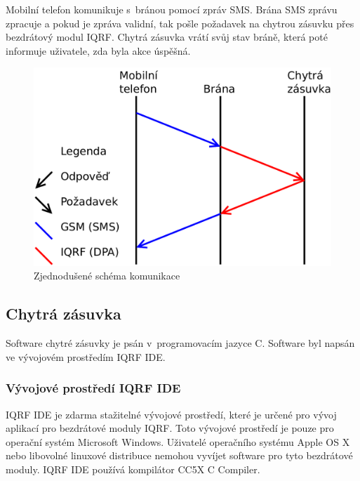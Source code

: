 \documentclass[12pt,a4paper,oneside]{article}
\begin{document}
Mobilní telefon komunikuje s~bránou pomocí zpráv SMS. Brána SMS zprávu zpracuje a pokud je zpráva validní, tak pošle požadavek na chytrou zásuvku přes bezdrátový modul IQRF. Chytrá zásuvka vrátí svůj stav bráně, která poté informuje uživatele, zda byla akce úspěšná.

\begin{figure}[H]
\centering
\label{fig:iqrf/zjednodusene-schema}
\includegraphics[width = 128mm]{img/blokove-schema/komunikace0.pdf}
\caption{Zjednodušené schéma komunikace}
\end{figure}

\newpage

\subsection{Chytrá zásuvka}

Software chytré zásuvky je psán v~programovacím jazyce C. Software byl napsán ve vývojovém prostředím IQRF IDE\cite{iqrf/ide}.

\subsubsection{Vývojové prostředí IQRF IDE}

IQRF IDE\cite{iqrf/ide} je zdarma stažitelné vývojové prostředí, které je určené pro vývoj aplikací pro bezdrátové moduly IQRF. Toto vývojové prostředí je pouze pro operační systém Microsoft Windows. Uživatelé operačního systému Apple OS X nebo libovolné linuxové distribuce nemohou vyvíjet software pro tyto bezdrátové moduly. IQRF IDE používá kompilátor CC5X C Compiler\cite{cc5x-compiler}.
\end{document}
